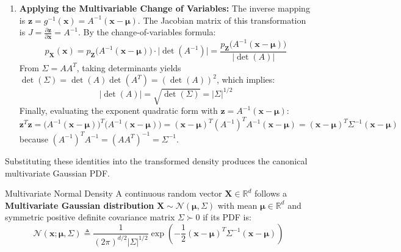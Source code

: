 \begin{enumerate}
    \item \textbf{Applying the Multivariable Change of Variables:}
    The inverse mapping is $\mathbf{z} = g^{-1}(\mathbf{x}) = A^{-1}(\mathbf{x} - \boldsymbol{\mu})$.
    The Jacobian matrix of this transformation is $J = \frac{\partial \mathbf{z}}{\partial \mathbf{x}} = A^{-1}$.
    By the change-of-variables formula:
    \begin{equation}
    p_\mathbf{X}(\mathbf{x}) = p_\mathbf{Z}\big(A^{-1}(\mathbf{x} - \boldsymbol{\mu})\big) \cdot \big|\det(A^{-1})\big| = \frac{p_\mathbf{Z}\big(A^{-1}(\mathbf{x} - \boldsymbol{\mu})\big)}{|\det(A)|}
    \end{equation}
    From $\Sigma = A A^T$, taking determinants yields $\det(\Sigma) = \det(A)\det(A^T) = (\det(A))^2$, which implies:
    \begin{equation}
    |\det(A)| = \sqrt{\det(\Sigma)} = |\Sigma|^{1/2}
    \end{equation}
    Finally, evaluating the exponent quadratic form with $\mathbf{z} = A^{-1}(\mathbf{x} - \boldsymbol{\mu})$:
    \begin{equation}
    \mathbf{z}^T\mathbf{z} = \big(A^{-1}(\mathbf{x} - \boldsymbol{\mu})\big)^T \big(A^{-1}(\mathbf{x} - \boldsymbol{\mu})\big) = (\mathbf{x} - \boldsymbol{\mu})^T (A^{-1})^T A^{-1} (\mathbf{x} - \boldsymbol{\mu}) = (\mathbf{x} - \boldsymbol{\mu})^T \Sigma^{-1} (\mathbf{x} - \boldsymbol{\mu})
    \end{equation}
    because $(A^{-1})^T A^{-1} = (A A^T)^{-1} = \Sigma^{-1}$.
\end{enumerate}
Substituting these identities into the transformed density produces the canonical multivariate Gaussian PDF.

\begin{definitionbox}{Multivariate Normal Density}
A continuous random vector $\mathbf{X} \in \mathbb{R}^d$ follows a \textbf{Multivariate Gaussian distribution} $\mathbf{X} \sim \mathcal{N}(\boldsymbol{\mu}, \Sigma)$ with mean $\boldsymbol{\mu} \in \mathbb{R}^d$ and symmetric positive definite covariance matrix $\Sigma \succ 0$ if its PDF is:
\begin{equation}
\mathcal{N}(\mathbf{x}; \boldsymbol{\mu}, \Sigma) \triangleq \frac{1}{(2\pi)^{d/2} |\Sigma|^{1/2}} \exp\left( -\frac{1}{2}(\mathbf{x} - \boldsymbol{\mu})^T \Sigma^{-1} (\mathbf{x} - \boldsymbol{\mu}) \right)
\label{eq:mvn_def}
\end{equation}
\end{definitionbox}

